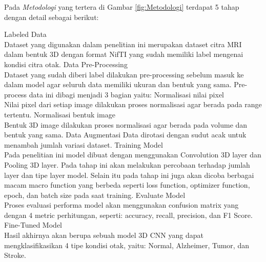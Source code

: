 Pada \emph{Metodologi} yang tertera di Gambar \ref{fig:Metodologi} terdapat 5 tahap dengan detail sebagai berikut:
\begin{outline}
    \1 Labeled Data \\
       Dataset yang digunakan dalam penelitian ini merupakan dataset citra MRI dalam bentuk 3D dengan format NifTI yang sudah memiliki label mengenai kondisi citra otak.
    \1 Data Pre-Processing \\
       Dataset yang sudah diberi label dilakukan pre-processing sebelum masuk ke dalam model agar seluruh data memiliki ukuran dan bentuk yang sama. Pre-process data ini dibagi menjadi 3 bagian yaitu:
       \2 Normalisasi nilai pixel \\
          Nilai pixel dari setiap image dilakukan proses normalisasi agar berada pada range tertentu.
       \2 Normalisasi bentuk image \\
          Bentuk 3D image dilakukan proses normalisasi agar berada pada volume dan bentuk yang sama.
       \2 Data Augmentasi
          Data dirotasi dengan sudut acak untuk menambah jumlah variasi dataset.
    \1 Training Model \\
       Pada penelitian ini model dibuat dengan menggunakan Convolution 3D layer dan Pooling 3D layer. Pada tahap ini akan melakukan percobaan terhadap jumlah layer dan tipe layer model. Selain itu pada tahap ini juga akan dicoba berbagai macam macro function yang berbeda seperti loss function, optimizer function, epoch, dan batch size pada saat training.
    \1 Evaluate Model \\
       Proses evaluasi performa model akan menggunakan confusion matrix yang dengan 4 metric perhitungan, seperti: accuracy, recall, precision, dan F1 Score.
    \1 Fine-Tuned Model \\
       Hasil akhirnya akan berupa sebuah model 3D CNN yang dapat mengklasifikasikan 4 tipe kondisi otak, yaitu: Normal, Alzheimer, Tumor, dan Stroke.
\end{outline}